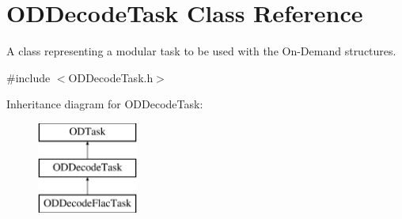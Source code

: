 \hypertarget{class_o_d_decode_task}{}\section{O\+D\+Decode\+Task Class Reference}
\label{class_o_d_decode_task}


A class representing a modular task to be used with the On-\/\+Demand structures.  




{\ttfamily \#include $<$O\+D\+Decode\+Task.\+h$>$}

Inheritance diagram for O\+D\+Decode\+Task\+:\begin{figure}[H]
\begin{center}
\leavevmode
\includegraphics[height=3.000000cm]{class_o_d_decode_task}
\end{center}
\end{figure}
